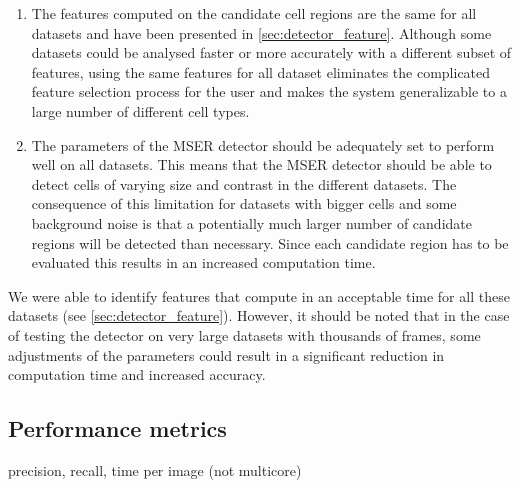 		\begin{enumerate}
			\item The features computed on the candidate cell regions are the same for all datasets and have been presented in \cref{sec:detector_feature}. Although some datasets could be analysed faster or more accurately with a different subset of features, using the same features for all dataset eliminates the complicated feature selection process for the user and makes the system generalizable to a large number of different cell types.
			
			\item The parameters of the MSER detector should be adequately set to perform well on all datasets. This means that the MSER detector should be able to detect cells of varying size and contrast in the different datasets. The consequence of this limitation for datasets with bigger cells and some background noise is that a potentially much larger number of candidate regions will be detected than necessary. Since each candidate region has to be evaluated this results in an increased computation time.
		\end{enumerate}
		
		We were able to identify features that compute in an acceptable time for all these datasets (see \cref{sec:detector_feature}). However, it should be noted that in the case of testing the detector on very large datasets with thousands of frames, some adjustments of the parameters could result in a significant reduction in computation time and increased accuracy.
		
		\subsection{Performance metrics \statusnew}
			precision, recall, time per image (not multicore)
		
